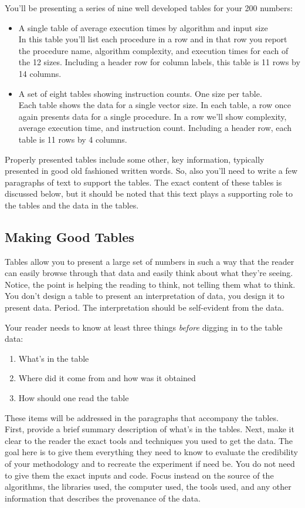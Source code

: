 \documentclass[]{tufte-handout}
\begin{document}
You'll be presenting a series of nine well developed tables for your 200 numbers:
\begin{itemize}
\item A single table of average execution times by algorithm and input size \\
In this table you'll list each procedure in a row and in that row you report the procedure name, algorithm complexity, and execution times for each of the 12 sizes.  Including a header row for column labels, this table is 11 rows by 14 columns.
\item A set of eight tables showing instruction counts. One size per table. \\
Each table shows the data for a single vector size. In each table, a row once again presents data for a single procedure. In a row we'll show complexity, average execution time, and instruction count.  Including a header row, each table is 11 rows by 4 columns.
\end{itemize}
Properly presented tables include some other, key information, typically presented in good old fashioned written words. So, also you'll need to write a few paragraphs of text to support the tables. The exact content of these tables is discussed below, but it should be noted that this text plays a supporting role to the tables and the data in the tables.   


\subsection{Making Good Tables}

Tables allow you to present a large set of numbers in such a way that the reader can easily browse through that data and easily think about what they're seeing.  Notice, the point is helping the reading to think, not telling them what to think. You don't design a table to present an interpretation of data, you design it to present data. Period.  The interpretation should be self-evident from the data.

Your reader needs to know at least three things \textit{before} digging in to the table data:
\begin{enumerate}
\item What's in the table
\item Where did it come from and how was it obtained
\item How should one read the table
\end{enumerate}
These items will be addressed in the paragraphs that accompany the tables. First, provide a brief summary description of what's in the tables. Next, make it clear to the reader the exact tools and techniques you used to get the data. The goal here is to give them everything they need to know to evaluate the credibility of your methodology and to recreate the experiment if need be.  You do not need to give them the exact inputs and code. Focus instead on the source of the algorithms, the libraries used, the computer used, the tools used, and any other information that describes the provenance of the data. 
\end{document}
